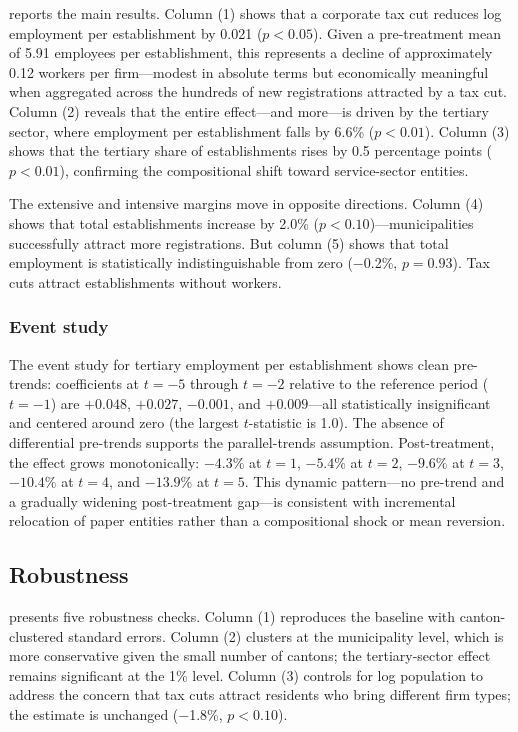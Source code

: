 \documentclass[12pt]{article}
\begin{document}


 reports the main results. Column (1) shows that a corporate tax cut reduces log employment per establishment by 0.021 ($p < 0.05$). Given a pre-treatment mean of 5.91 employees per establishment, this represents a decline of approximately 0.12 workers per firm---modest in absolute terms but economically meaningful when aggregated across the hundreds of new registrations attracted by a tax cut. Column (2) reveals that the entire effect---and more---is driven by the tertiary sector, where employment per establishment falls by 6.6\% ($p < 0.01$). Column (3) shows that the tertiary share of establishments rises by 0.5 percentage points ($p < 0.01$), confirming the compositional shift toward service-sector entities.

The extensive and intensive margins move in opposite directions. Column (4) shows that total establishments increase by 2.0\% ($p < 0.10$)---municipalities successfully attract more registrations. But column (5) shows that total employment is statistically indistinguishable from zero ($-$0.2\%, $p = 0.93$). Tax cuts attract establishments without workers.

\subsubsection*{Event study} The event study for tertiary employment per establishment shows clean pre-trends: coefficients at $t = -5$ through $t = -2$ relative to the reference period ($t = -1$) are $+0.048$, $+0.027$, $-0.001$, and $+0.009$---all statistically insignificant and centered around zero (the largest $t$-statistic is 1.0). The absence of differential pre-trends supports the parallel-trends assumption. Post-treatment, the effect grows monotonically: $-4.3\%$ at $t = 1$, $-5.4\%$ at $t = 2$, $-9.6\%$ at $t = 3$, $-10.4\%$ at $t = 4$, and $-13.9\%$ at $t = 5$. This dynamic pattern---no pre-trend and a gradually widening post-treatment gap---is consistent with incremental relocation of paper entities rather than a compositional shock or mean reversion.

\subsection{Robustness}



 presents five robustness checks. Column (1) reproduces the baseline with canton-clustered standard errors. Column (2) clusters at the municipality level, which is more conservative given the small number of cantons; the tertiary-sector effect remains significant at the 1\% level. Column (3) controls for log population to address the concern that tax cuts attract residents who bring different firm types; the estimate is unchanged ($-$1.8\%, $p < 0.10$).
\end{document}
